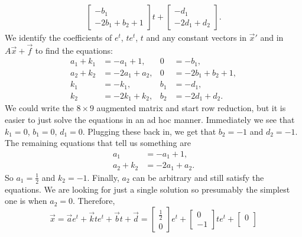 \documentclass{ximera}
\begin{document}
\begin{exampleSol}
\begin{equation*}
\begin{split}
            \begin{bmatrix}
                -b_1 \\ 
                -2b_1+b_2+1
            \end{bmatrix}
            t +
            \begin{bmatrix}
                -d_1 \\ 
                -2d_1+d_2
            \end{bmatrix} .
        \end{split}
    \end{equation*}
    We identify the coefficients of $e^t$, $te^t$, $t$ and any constant vectors in $\vec{x}'$ and in $A\vec{x}+\vec{f}$ to find the equations:
    \begin{align*}
        a_1+k_1 & = -a_1+1 , & 0 & = -b_1 , \\
        a_2+k_2 & = -2a_1+a_2 , & 0 & = -2b_1+b_2 + 1 , \\
        k_1 & = -k_1 , & b_1 & = -d_1 , \\
        k_2 & = -2k_1+k_2 , & b_2 & = -2d_1+d_2 .
    \end{align*}
    We could write the $8 \times 9$ augmented matrix and start row reduction, but it is easier to just solve the equations in an ad hoc manner. Immediately we see that $k_1 = 0$, $b_1 = 0$, $d_1 = 0$.  Plugging these back in, we get that $b_2 = -1$ and $d_2 = -1$.  The remaining equations that tell us something are
    \begin{align*}
        a_1 & = -a_1+1 , \\
        a_2+k_2 & = -2a_1+a_2 .
    \end{align*}
    So $a_1 = \frac{1}{2}$ and $k_2 = -1$.  Finally, $a_2$ can be arbitrary and still satisfy the equations.  We are looking for just a single solution so presumably the simplest one is when $a_2 = 0$. Therefore,
    \begin{equation*}
        \vec{x} =  \vec{a} e^{t} + \vec{k} t e^{t} + \vec{b} t + \vec{d} =
        \begin{bmatrix}
            \frac{1}{2} \\ 
            0
        \end{bmatrix}
        e^t +
        \begin{bmatrix}
            0 \\ 
            -1
        \end{bmatrix}
        te^t +
        \begin{bmatrix}
            0 \\ 

\end{bmatrix}
\end{equation*}
\end{exampleSol}
\end{document}
